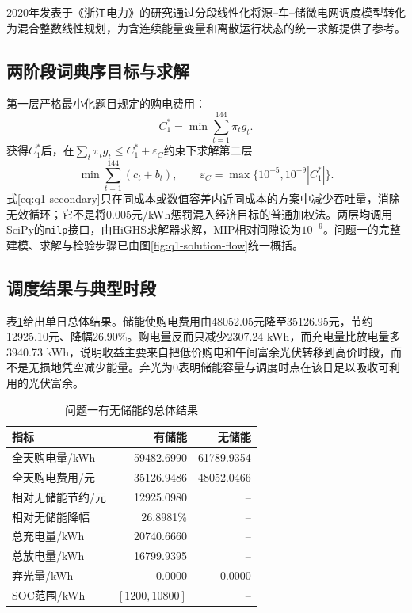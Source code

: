 \documentclass[UTF8,a4paper,12pt,fontset=fandol]{ctexart}
\numberwithin{equation}{section}
\begin{document}
2020年发表于《浙江电力》的研究通过分段线性化将源--车--储微电网调度模型转化为混合整数线性规划，为含连续能量变量和离散运行状态的统一求解提供了参考\cite{chen2020milp}。

\subsection{两阶段词典序目标与求解}

第一层严格最小化题目规定的购电费用：
\begin{equation}
C_1^*=\min\sum_{t=1}^{144}\pi_t g_t.
\label{eq:q1-primary}
\end{equation}
获得$C_1^*$后，在$\sum_t\pi_tg_t\le C_1^*+\varepsilon_C$约束下求解第二层
\begin{equation}
\min\sum_{t=1}^{144}(c_t+b_t),\qquad
\varepsilon_C=\max\{10^{-5},10^{-9}|C_1^*|\}.
\label{eq:q1-secondary}
\end{equation}
式\ref{eq:q1-secondary}只在同成本或数值容差内近同成本的方案中减少吞吐量，消除无效循环；它不是将0.005元/kWh惩罚混入经济目标的普通加权法。两层均调用SciPy的\texttt{milp}接口，由HiGHS求解器求解，MIP相对间隙设为$10^{-9}$。问题一的完整建模、求解与检验步骤已由图\ref{fig:q1-solution-flow}统一概括。

\subsection{调度结果与典型时段}

表\ref{tab:q1-main-results}给出单日总体结果。储能使购电费用由48052.05元降至35126.95元，节约12925.10元、降幅26.90\%。购电量反而只减少2307.24 kWh，而充电量比放电量多3940.73 kWh，说明收益主要来自把低价购电和午间富余光伏转移到高价时段，而不是无损地凭空减少能量。弃光为0表明储能容量与调度时点在该日足以吸收可利用的光伏富余。

\begin{table}[htbp]
\centering
\small
\caption{问题一有无储能的总体结果}\label{tab:q1-main-results}
\begin{tabular}{lrr}
\toprule
指标 & 有储能 & 无储能\\
\midrule
全天购电量/kWh & 59482.6990 & 61789.9354\\
全天购电费用/元 & 35126.9486 & 48052.0466\\
相对无储能节约/元 & 12925.0980 & --\\
相对无储能降幅 & 26.8981\% & --\\
总充电量/kWh & 20740.6660 & --\\
总放电量/kWh & 16799.9395 & --\\
弃光量/kWh & 0.0000 & 0.0000\\
SOC范围/kWh & $[1200,10800]$ & --\\
\bottomrule
\end{tabular}
\end{table}
\end{document}
